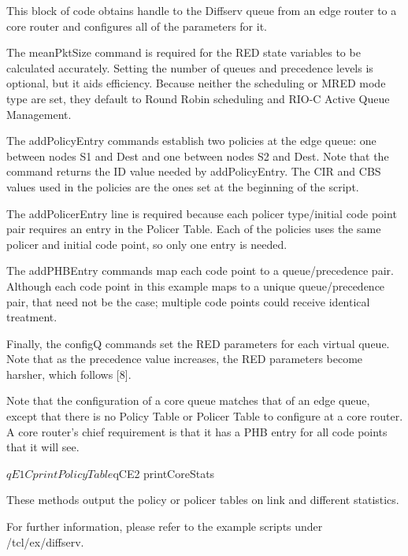 This block of code obtains handle to the Diffserv queue from an edge router to
a core router and configures all of the parameters for it.

The meanPktSize command is required for the RED state variables to be calculated
accurately.  Setting the number of queues and precedence levels is optional, but
it aids efficiency. Because neither the scheduling or MRED mode type are set, 
they default to Round Robin scheduling and RIO-C Active Queue Management.

The addPolicyEntry commands establish two policies at the edge queue: one 
between nodes S1 and Dest and one between nodes S2 and Dest.  Note that the 
\code{[$s1 id]} command returns the ID value needed by addPolicyEntry.  The CIR and CBS values used in the policies are the ones set at the beginning of the script.

The addPolicerEntry line is required because each policer type/initial code point pair requires an entry in the Policer Table.  Each of the policies uses the same policer and initial code point, so only one entry is needed.

The addPHBEntry commands map each code point to a queue/precedence pair.  Although each code point in this example maps to a unique queue/precedence pair, that need not be the case; multiple code points could receive identical treatment.

Finally, the configQ commands set the RED parameters for each virtual queue.  Note that as the precedence value increases, the RED parameters become harsher, which follows [8].


Note that the configuration of a core queue matches that of an edge queue, except that there is no Policy Table or Policer Table to configure at a core router.  A core router's chief requirement is that it has a PHB entry for all code points that it will see.

\begin{program}
$qE1C printPolicyTable
$qCE2 printCoreStats
\end{program}

These methods output the policy or policer tables on link and different statistics.  

For further information, please refer to the example scripts under \ns/tcl/ex/diffserv.
